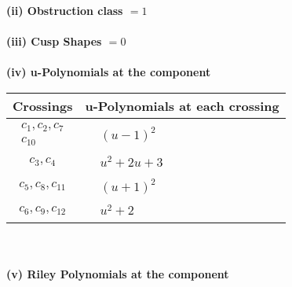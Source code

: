 \documentclass[1p]{elsarticle_modified}
\theoremstyle{definition}
\begin{document}
\flushleft \textbf{(ii) Obstruction class $= 1$}\\~\\
\flushleft \textbf{(iii) Cusp Shapes $= 0$}\\~\\
\newpage\renewcommand{\arraystretch}{1}
\flushleft \textbf{(iv) u-Polynomials at the component}\newline \\
\begin{tabular}{m{50pt}|m{274pt}}
Crossings & \hspace{64pt}u-Polynomials at each crossing \\
\hline $$\begin{aligned}c_{1},c_{2},c_{7}\\c_{10}\end{aligned}$$&$\begin{aligned}
&(u-1)^2
\end{aligned}$\\
\hline $$\begin{aligned}c_{3},c_{4}\end{aligned}$$&$\begin{aligned}
&u^2+2 u+3
\end{aligned}$\\
\hline $$\begin{aligned}c_{5},c_{8},c_{11}\end{aligned}$$&$\begin{aligned}
&(u+1)^2
\end{aligned}$\\
\hline $$\begin{aligned}c_{6},c_{9},c_{12}\end{aligned}$$&$\begin{aligned}
&u^2+2
\end{aligned}$\\
\hline
\end{tabular}\\~\\
\newpage\renewcommand{\arraystretch}{1}
\flushleft \textbf{(v) Riley Polynomials at the component}\newline \\
\end{document}
